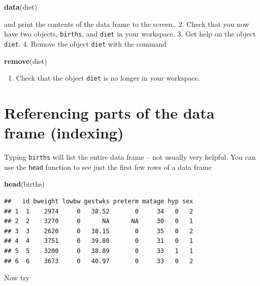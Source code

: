 \documentclass[
]{book}
\newenvironment{Shaded}{\begin{snugshade}}{\end{snugshade}}
\newcommand{\FunctionTok}[1]{\textcolor[rgb]{0.13,0.29,0.53}{\textbf{#1}}}
\newcommand{\NormalTok}[1]{#1}
\providecommand{\tightlist}{%
  \setlength{\itemsep}{0pt}\setlength{\parskip}{0pt}}
\begin{document}
\begin{Shaded}
\begin{Highlighting}[]
\FunctionTok{data}\NormalTok{(diet)}
\end{Highlighting}
\end{Shaded}

and print the contents of the data frame to the screen..
2. Check that you now have two objects, \texttt{births}, and \texttt{diet} in your workspace.
3. Get help on the object \texttt{diet}.
4. Remove the object \texttt{diet} with the command

\begin{Shaded}
\begin{Highlighting}[]
\FunctionTok{remove}\NormalTok{(diet)}
\end{Highlighting}
\end{Shaded}

\begin{enumerate}
\def\labelenumi{\arabic{enumi}.}
\setcounter{enumi}{4}
\tightlist
\item
  Check that the object \texttt{diet} is no longer in your workspace.
\end{enumerate}

\section{Referencing parts of the data frame (indexing)}\label{referencing-parts-of-the-data-frame-indexing}

Typing \texttt{births} will list the entire data frame -- not usually
very helpful. You can use the \texttt{head} function to see just the
first few rows of a data frame

\begin{Shaded}
\begin{Highlighting}[]
\FunctionTok{head}\NormalTok{(births)}
\end{Highlighting}
\end{Shaded}

\begin{verbatim}
##   id bweight lowbw gestwks preterm matage hyp sex
## 1  1    2974     0   38.52       0     34   0   2
## 2  2    3270     0      NA      NA     30   0   1
## 3  3    2620     0   38.15       0     35   0   2
## 4  4    3751     0   39.80       0     31   0   1
## 5  5    3200     0   38.89       0     33   1   1
## 6  6    3673     0   40.97       0     33   0   2
\end{verbatim}

Now try
\end{document}
